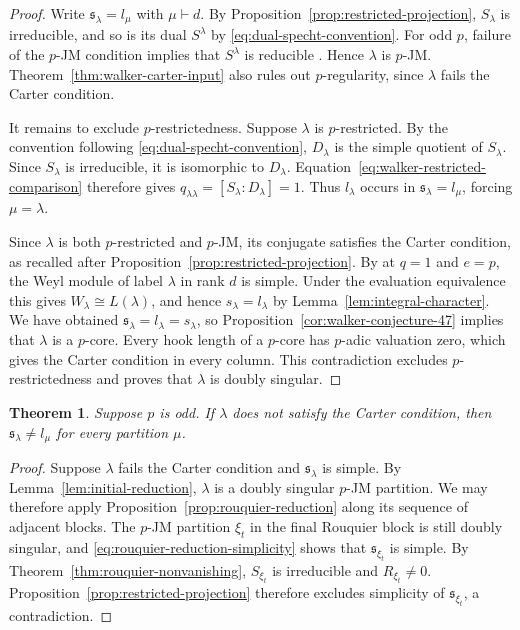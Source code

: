 \documentclass[12pt,reqno,a4paper]{amsart}
\numberwithin{equation}{section}
\numberwithin{figure}{section}
\theoremstyle{plain}
\newtheorem{theorem}{Theorem}[section]
\theoremstyle{definition}
\begin{document}
\begin{proof}
Write $\mathfrak{s}_\lambda=l_\mu$ with $\mu\vdash d$.
By Proposition~\ref{prop:restricted-projection}, $S_\lambda$ is
irreducible, and so is its dual $S^\lambda$ by
\eqref{eq:dual-specht-convention}.  For odd $p$, failure of the
$p$-JM condition implies that $S^\lambda$ is reducible
\cite[Section~2, proof of the \emph{if} part of Conjecture~1.1]{FayersReducible}.
Hence $\lambda$ is $p$-JM.  Theorem~\ref{thm:walker-carter-input}
also rules out $p$-regularity, since $\lambda$ fails the Carter condition.

It remains to exclude $p$-restrictedness.  Suppose $\lambda$ is
$p$-restricted.  By the convention following
\eqref{eq:dual-specht-convention}, $D_\lambda$ is the simple quotient
of $S_\lambda$.  Since $S_\lambda$ is irreducible, it is isomorphic
to $D_\lambda$.  Equation~\eqref{eq:walker-restricted-comparison}
therefore gives $q_{\lambda\lambda}=[S_\lambda:D_\lambda]=1$.
Thus $l_\lambda$ occurs in $\mathfrak{s}_\lambda=l_\mu$, forcing
$\mu=\lambda$.

Since $\lambda$ is both $p$-restricted and $p$-JM, its conjugate
satisfies the Carter condition, as recalled after
Proposition~\ref{prop:restricted-projection}.  By
\cite[Proposition~1.2]{Fayers} at $q=1$ and $e=p$, the Weyl module
of label $\lambda$ in rank $d$ is simple.  Under the evaluation
equivalence this gives $W_\lambda\cong L(\lambda)$, and hence
$s_\lambda=l_\lambda$ by Lemma~\ref{lem:integral-character}.
We have obtained $\mathfrak{s}_\lambda=l_\lambda=s_\lambda$, so
Proposition~\ref{cor:walker-conjecture-47} implies that $\lambda$ is a
$p$-core.  Every hook length of a $p$-core has $p$-adic valuation
zero, which gives the Carter condition in every column.  This
contradiction excludes $p$-restrictedness and proves that $\lambda$ is
doubly singular.
\end{proof}

\begin{theorem}\label{thm:conj46-odd}
Suppose $p$ is odd.  If $\lambda$ does not satisfy the Carter condition, then $\mathfrak{s}_\lambda\neq l_\mu$ for every partition $\mu$.
\end{theorem}

\begin{proof}
Suppose $\lambda$ fails the Carter condition and $\mathfrak{s}_\lambda$
is simple.  By Lemma~\ref{lem:initial-reduction}, $\lambda$ is a doubly
singular $p$-JM partition.  We may therefore apply
Proposition~\ref{prop:rouquier-reduction} along its sequence of adjacent
blocks.  The $p$-JM partition $\xi_t$ in the final Rouquier block is
still doubly singular, and \eqref{eq:rouquier-reduction-simplicity}
shows that $\mathfrak{s}_{\xi_t}$ is simple.  By
Theorem~\ref{thm:rouquier-nonvanishing}, $S_{\xi_t}$ is irreducible
and $R_{\xi_t}\neq0$.  Proposition~\ref{prop:restricted-projection}
therefore excludes simplicity of $\mathfrak{s}_{\xi_t}$, a contradiction.
\end{proof}
\end{document}
